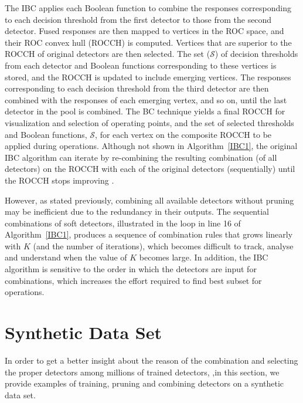 



The IBC applies each Boolean function to combine the responses corresponding to each decision threshold from the first detector to those from the second detector.
Fused responses are then mapped to vertices in the ROC space, and their ROC convex hull (ROCCH) is computed.
Vertices that are superior to the ROCCH of original detectors are then selected.
The set ($\mathcal{S}$) of decision thresholds from each detector and Boolean functions corresponding to these vertices is stored, and the ROCCH is updated to include emerging vertices.
The responses corresponding to each decision threshold from the third detector are then combined with the responses of each emerging vertex, and so on, until the last detector in the pool is combined.
The BC technique yields a final ROCCH for visualization and selection of operating points, and the set of selected thresholds and Boolean functions, $\mathcal{S}$, for each vertex on the composite ROCCH to be applied during operations.
Although not shown in Algorithm~\ref{IBC1}, the original IBC algorithm can iterate by re-combining the resulting combination (of all detectors) on the ROCCH with each of the original detectors (sequentially) until the ROCCH stops improving \cite{Khreich2010-ICPR}.

However, as stated previously, combining all available detectors without pruning may be inefficient due to the redundancy in their outputs.
The sequential combinations of soft detectors, illustrated in the loop in line 16 of Algorithm~\ref{IBC1}, produces a sequence of combination rules that grows linearly with $K$ (and the number of iterations), which becomes difficult to track, analyse and understand when the value of $K$ becomes large.
In addition, the IBC algorithm is sensitive to the order in which the detectors are input for combinations, which increases the effort required to find best subset for operations.

 \section{Synthetic Data Set}
\label{sec:synthetic}
In order to get a better insight about the reason of the combination and selecting the proper detectors among millions of trained detectors,
,in this section, we provide examples of training, pruning and combining detectors on a synthetic data set. 

